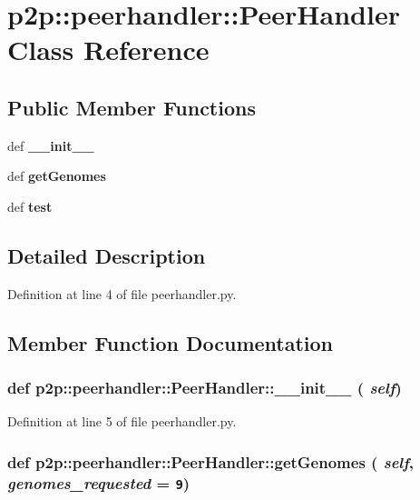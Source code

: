 \section{p2p::peerhandler::PeerHandler Class Reference}
\label{classp2p_1_1peerhandler_1_1PeerHandler}
\subsection*{Public Member Functions}
\begin{CompactItemize}
\item 
def {\bf \_\-\_\-init\_\-\_\-}
\item 
def {\bf getGenomes}
\item 
def {\bf test}
\end{CompactItemize}


\subsection{Detailed Description}


Definition at line 4 of file peerhandler.py.

\subsection{Member Function Documentation}
\subsubsection{\setlength{\rightskip}{0pt plus 5cm}def p2p::peerhandler::PeerHandler::\_\-\_\-init\_\-\_\- ( {\em self})}\label{classp2p_1_1peerhandler_1_1PeerHandler_375990d505a756dac167868f84a5881b}




Definition at line 5 of file peerhandler.py.
\subsubsection{\setlength{\rightskip}{0pt plus 5cm}def p2p::peerhandler::PeerHandler::getGenomes ( {\em self},  {\em genomes\_\-requested} = {\tt 9})}\label{classp2p_1_1peerhandler_1_1PeerHandler_93fc76dafea8043970877bffff00b7b1}




